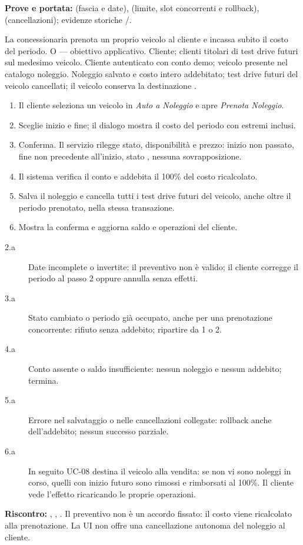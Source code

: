 \begin{flushleft}\noindent\textbf{Prove e portata:}  (fascia e date),  (limite, slot concorrenti e rollback),  (cancellazioni); evidenze storiche /.\end{flushleft}
\clearpage
{}
{La concessionaria prenota un proprio veicolo al cliente e incassa subito il costo del periodo.}
{O --- obiettivo applicativo.}
{Cliente; clienti titolari di test drive futuri sul medesimo veicolo.}
{Cliente autenticato con conto demo; veicolo presente nel catalogo noleggio.}
{Noleggio salvato e costo intero addebitato; test drive futuri del veicolo cancellati;
il veicolo conserva la destinazione .}
\principale
\begin{enumerate}
\item Il cliente seleziona un veicolo in \emph{Auto a Noleggio} e apre \emph{Prenota Noleggio}.
\item Sceglie inizio e fine; il dialogo mostra il costo del periodo con estremi inclusi.
\item Conferma. Il servizio rilegge stato, disponibilit\`a e prezzo: inizio non passato,
      fine non precedente all'inizio, stato , nessuna sovrapposizione.
\item Il sistema verifica il conto e addebita il 100\% del costo ricalcolato.
\item Salva il noleggio e cancella tutti i test drive futuri del veicolo,
      anche oltre il periodo prenotato, nella stessa transazione.
\item Mostra la conferma e aggiorna saldo e operazioni del cliente.
\end{enumerate}
\alternative
\begin{description}
\item[2.a] Date incomplete o invertite: il preventivo non \`e valido;
  il cliente corregge il periodo al passo 2 oppure annulla senza effetti.
\item[3.a] Stato cambiato o periodo gi\`a occupato, anche per una prenotazione concorrente:
  rifiuto senza addebito; ripartire da 1 o 2.
\item[4.a] Conto assente o saldo insufficiente: nessun noleggio e nessun addebito; termina.
\item[5.a] Errore nel salvataggio o nelle cancellazioni collegate: rollback
  anche dell'addebito; nessun successo parziale.
\item[6.a] In seguito UC-08 destina il veicolo alla vendita: se non vi sono
  noleggi in corso, quelli con inizio futuro sono rimossi e rimborsati al 100\%.
  Il cliente vede l'effetto ricaricando le proprie operazioni.
\end{description}
\begin{flushleft}\textbf{Riscontro:} , ,
. Il preventivo non \`e un accordo fissato:
il costo viene ricalcolato alla prenotazione. La UI non offre una cancellazione
autonoma del noleggio al cliente.\end{flushleft}


